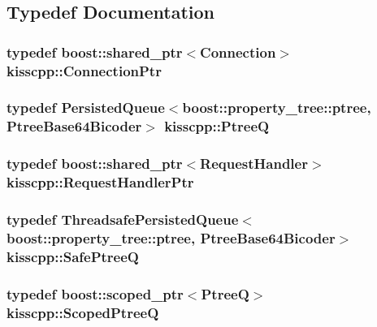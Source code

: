 \subsection{Typedef Documentation}
\hypertarget{namespacekisscpp_a4632e92aebdc8fa1c220da260469cbb2}{
\subsubsection[{Connection\-Ptr}]{\setlength{\rightskip}{0pt plus 5cm}typedef boost\-::shared\-\_\-ptr$<${\bf Connection}$>$ {\bf kisscpp\-::\-Connection\-Ptr}}}\label{namespacekisscpp_a4632e92aebdc8fa1c220da260469cbb2}
\hypertarget{namespacekisscpp_af1d6724570f46ac378171bd45ddf6903}{
\subsubsection[{Ptree\-Q}]{\setlength{\rightskip}{0pt plus 5cm}typedef {\bf Persisted\-Queue}$<$boost\-::property\-\_\-tree\-::ptree, {\bf Ptree\-Base64\-Bicoder}$>$ {\bf kisscpp\-::\-Ptree\-Q}}}\label{namespacekisscpp_af1d6724570f46ac378171bd45ddf6903}
\hypertarget{namespacekisscpp_a21e40edcd4f1a3c7c1cc0015b576c8e5}{
\subsubsection[{Request\-Handler\-Ptr}]{\setlength{\rightskip}{0pt plus 5cm}typedef boost\-::shared\-\_\-ptr$<${\bf Request\-Handler}$>$ {\bf kisscpp\-::\-Request\-Handler\-Ptr}}}\label{namespacekisscpp_a21e40edcd4f1a3c7c1cc0015b576c8e5}
\hypertarget{namespacekisscpp_ac48ab954f4898861f383b80e857e17cc}{
\subsubsection[{Safe\-Ptree\-Q}]{\setlength{\rightskip}{0pt plus 5cm}typedef {\bf Threadsafe\-Persisted\-Queue}$<$boost\-::property\-\_\-tree\-::ptree, {\bf Ptree\-Base64\-Bicoder}$>$ {\bf kisscpp\-::\-Safe\-Ptree\-Q}}}\label{namespacekisscpp_ac48ab954f4898861f383b80e857e17cc}
\hypertarget{namespacekisscpp_a64a7093fe1bdc3f323b469e800eebc7f}{
\subsubsection[{Scoped\-Ptree\-Q}]{\setlength{\rightskip}{0pt plus 5cm}typedef boost\-::scoped\-\_\-ptr$<${\bf Ptree\-Q}$>$ {\bf kisscpp\-::\-Scoped\-Ptree\-Q}}}\label{namespacekisscpp_a64a7093fe1bdc3f323b469e800eebc7f}
